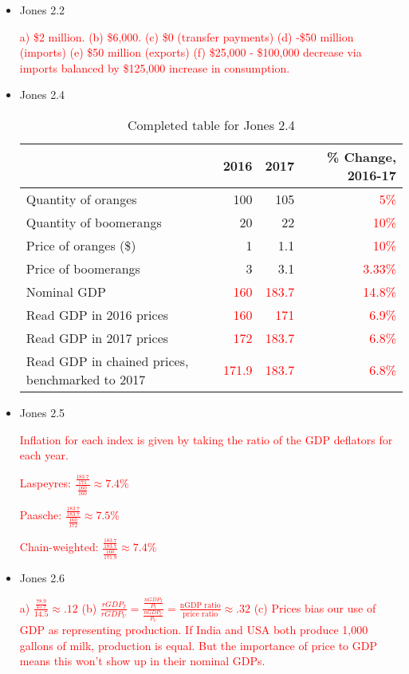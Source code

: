 \documentclass{article}
\begin{document}
\begin{itemize}
\item Jones 2.2

\textcolor{red}{a) \$2 million. (b) \$6,000. (c) \$0 (transfer payments) (d) -\$50 million (imports) (e) \$50 million (exports) (f) \$25,000 - \$100,000 decrease via imports balanced by \$125,000 increase in consumption.}

\item Jones 2.4

\begin{table}[hbtp]
\centering
\caption{Completed table for Jones 2.4}
\begin{tabular}{lrrr}
 & 2016 & 2017 & \% Change, 2016-17 \\
 \hline
 Quantity of oranges & 100 & 105 & \textcolor{red}{5\%} \\
 Quantity of boomerangs & 20 & 22 & \textcolor{red}{10\%} \\
 Price of oranges (\$) & 1 & 1.1 & \textcolor{red}{10\%} \\
 Price of boomerangs & 3 & 3.1 & \textcolor{red}{3.33\%} \\
 Nominal GDP & \textcolor{red}{160} & \textcolor{red}{183.7} & \textcolor{red}{14.8\%} \\
 Read GDP in 2016 prices & \textcolor{red}{160} & \textcolor{red}{171} & \textcolor{red}{6.9\%} \\
 Read GDP in 2017 prices & \textcolor{red}{172} & \textcolor{red}{183.7} & \textcolor{red}{6.8\%} \\
 Read GDP in chained prices, benchmarked to 2017 & \textcolor{red}{171.9} & \textcolor{red}{183.7} & \textcolor{red}{6.8\%} \\
 \hline
\end{tabular}
\end{table}

\item Jones 2.5

\textcolor{red}{Inflation for each index is given by taking the ratio of the GDP deflators for each year.}

\textcolor{red}{Laspeyres: $\frac{\frac{183.7}{171}}{\frac{160}{160}} \approx 7.4\%$}

\textcolor{red}{Paasche: $\frac{\frac{183.7}{183.7}}{\frac{160}{172}} \approx 7.5\%$}

\textcolor{red}{Chain-weighted: $\frac{\frac{183.7}{183.7}}{\frac{160}{171.9}} \approx 7.4\%$}

\item Jones 2.6

\textcolor{red}{%
a) $\frac{\frac{78.9}{45.7}}{14.5} \approx .12$ (b) $\frac{rGDP_I}{rGDP_U} = \frac{\frac{nGDP_I}{P_I}}{\frac{nGDP_U}{P_U}} = \frac{\mbox{nGDP ratio}}{\mbox{price ratio}} \approx .32$ (c) Prices bias our use of GDP as representing production. If India and USA both produce 1,000 gallons of milk, production is equal. But the importance of price to GDP means this won't show up in their nominal GDPs.%
}

\end{itemize}
\end{document}

